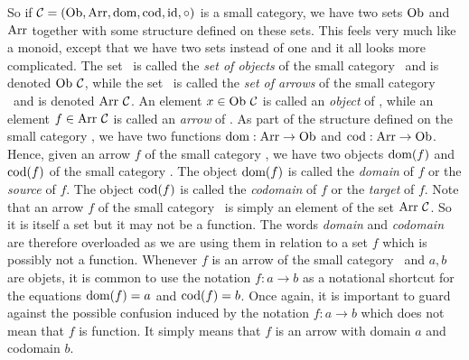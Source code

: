 So if $\mbox{$\cal C$}=(\mbox{\rm Ob}, \mbox{\rm Arr}, \mbox{\rm dom}, \mbox{\rm cod}, \mbox{\rm id}, \circ)$ is a small category, we have
two sets $\mbox{\rm Ob}$ and $\mbox{\rm Arr}$ together with some structure defined on these sets.
This feels very much like a monoid, except that we have two sets instead of one
and it all looks more complicated. The set \ob\ is called the {\em set of 
objects} of the small category \Cat\ and is denoted $\mbox{\rm Ob}\ \mbox{$\cal C$}$, while the set 
\arr\ is called the {\em set of arrows} of the small category \Cat\ and is 
denoted $\mbox{\rm Arr}\ \mbox{$\cal C$}$. An element $x\in\mbox{\rm Ob}\ \mbox{$\cal C$}$ is called an {\em object} 
of \Cat, while an element $f\in\mbox{\rm Arr}\ \mbox{$\cal C$}$ is called an {\em arrow} of \Cat.
As part of the structure defined on the small category \Cat, we have two
functions $\mbox{\rm dom}:\mbox{\rm Arr}\to\mbox{\rm Ob}$ and $\mbox{\rm cod}:\mbox{\rm Arr}\to\mbox{\rm Ob}$. Hence, given an arrow $f$
of the small category \Cat, we have two objects $\mbox{\rm dom}(f)$ and $\mbox{\rm cod}(f)$ of the
small category \Cat. The object $\mbox{\rm dom}(f)$ is called the {\em domain} of $f$
or the {\em source} of $f$. The object $\mbox{\rm cod}(f)$ is called the {\em codomain}
of $f$ or the {\em target} of $f$. Note that an arrow $f$ of the small 
category \Cat\ is simply an element of the set $\mbox{\rm Arr}\ \mbox{$\cal C$}$. So it is itself
a set but it may not be a function. The words {\em domain} and {\em codomain}
are therefore overloaded as we are using them in relation to a set $f$ which
is possibly not a function. Whenever $f$ is an arrow of the small category 
\Cat\ and $a,b$ are objets, it is common to use the notation $f:a\to b$ as
a notational shortcut for the equations $\mbox{\rm dom}(f)=a$ and $\mbox{\rm cod}(f)=b$. Once
again, it is important to guard against the possible confusion induced 
by the notation $f:a\to b$ which does not mean that $f$ is function. It 
simply means that $f$ is an arrow with domain $a$ and codomain $b$.

